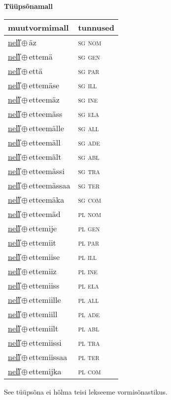 

\vspace{3.5em}
\noindent \begin{minipage}{\textwidth}
\noindent \textbf{Tüüpsõnamall \,}\\

\begin{sideways}
\begin{tabular}{l l}
muutvormimall & tunnused \\
\hline
\underline{nel̕l̕}\,$\oplus$\,äz & \textsc{ sg nom } \\
\underline{nel̕l̕}\,$\oplus$\,ettemä & \textsc{ sg gen } \\
\underline{nel̕l̕}\,$\oplus$\,että & \textsc{ sg par } \\
\underline{nel̕l̕}\,$\oplus$\,ettemäse & \textsc{ sg ill } \\
\underline{nel̕l̕}\,$\oplus$\,etteemäz & \textsc{ sg ine } \\
\underline{nel̕l̕}\,$\oplus$\,etteemäss & \textsc{ sg ela } \\
\underline{nel̕l̕}\,$\oplus$\,etteemälle & \textsc{ sg all } \\
\underline{nel̕l̕}\,$\oplus$\,etteemäll & \textsc{ sg ade } \\
\underline{nel̕l̕}\,$\oplus$\,etteemält & \textsc{ sg abl } \\
\underline{nel̕l̕}\,$\oplus$\,etteemässi & \textsc{ sg tra } \\
\underline{nel̕l̕}\,$\oplus$\,etteemässaa & \textsc{ sg ter } \\
\underline{nel̕l̕}\,$\oplus$\,etteemäka & \textsc{ sg com } \\
\underline{nel̕l̕}\,$\oplus$\,etteemäd & \textsc{ pl nom } \\
\underline{nel̕l̕}\,$\oplus$\,ettemije & \textsc{ pl gen } \\
\underline{nel̕l̕}\,$\oplus$\,ettemiit & \textsc{ pl par } \\
\underline{nel̕l̕}\,$\oplus$\,ettemiise & \textsc{ pl ill } \\
\underline{nel̕l̕}\,$\oplus$\,ettemiiz & \textsc{ pl ine } \\
\underline{nel̕l̕}\,$\oplus$\,ettemiiss & \textsc{ pl ela } \\
\underline{nel̕l̕}\,$\oplus$\,ettemiille & \textsc{ pl all } \\
\underline{nel̕l̕}\,$\oplus$\,ettemiill & \textsc{ pl ade } \\
\underline{nel̕l̕}\,$\oplus$\,ettemiilt & \textsc{ pl abl } \\
\underline{nel̕l̕}\,$\oplus$\,ettemiissi & \textsc{ pl tra } \\
\underline{nel̕l̕}\,$\oplus$\,ettemiissaa & \textsc{ pl ter } \\
\underline{nel̕l̕}\,$\oplus$\,ettemijka & \textsc{ pl com } \\
\end{tabular}
\end{sideways}
\label{tab:tüüpsõnamall-nel̕l̕äz}

\end{minipage}

 
\vspace{1em}
\noindent See tüüpsõna ei hõlma teisi lekseeme vormi\-sõnastikus.
